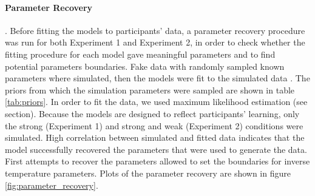 \documentclass[a4paper,12pt]{article} 			%
\begin{document}
\paragraph{Parameter Recovery}. Before fitting the models to participants' data, a parameter recovery procedure was run for both Experiment 1 and Experiment 2, in order to check whether the fitting procedure for each model gave meaningful parameters and to find potential parameters boundaries. Fake data with randomly sampled known parameters where simulated, then the models were fit to the simulated data \citep[see][]{Wilson2019a}. The priors from which the simulation parameters were sampled are shown in table \ref{tab:priors}. In order to fit the data, we used maximum likelihood estimation (see section). Because the models are designed to reflect participants' learning, only the strong (Experiment 1) and strong and weak (Experiment 2) conditions were simulated. High correlation between simulated and fitted data indicates that the model successfully recovered the parameters that were used to generate the data. First attempts to recover the parameters allowed to set the boundaries for inverse temperature parameters. Plots of the parameter recovery are shown in figure \ref{fig:parameter_recovery}.




\begin{table} 
    \centering 
    \caption{Priors for the parameters}
    \label{tab:priors}
    \end{table}
\end{document}
